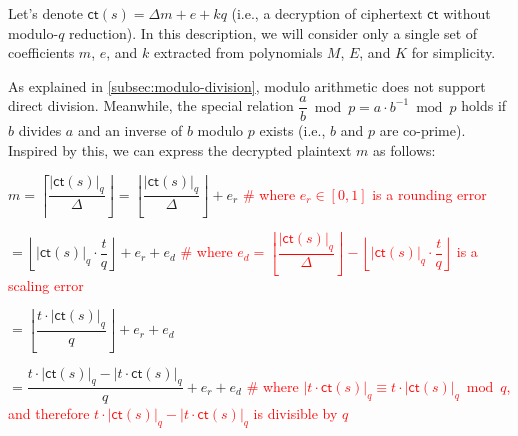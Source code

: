 Let's denote $\textsf{ct}(s) = \Delta m + e + kq$ (i.e., a decryption of ciphertext $\textsf{ct}$ without modulo-$q$ reduction). In this description, we will consider only a single set of coefficients $m$, $e$, and $k$ extracted from polynomials $M$, $E$, and $K$ for simplicity. 

As explained in \autoref{subsec:modulo-division}, modulo arithmetic does not support direct division. Meanwhile, the special relation $\dfrac{a}{b} \bmod p = a \cdot b^{-1} \bmod p$ holds if $b$ divides $a$ and an inverse of $b$ modulo $p$ exists (i.e., $b$ and $p$ are co-prime). Inspired by this, we can express the decrypted plaintext $m$ as follows: 

$m = \left\lceil\dfrac{|\textsf{ct}(s)|_q}{\Delta}\right\rfloor = \left\lfloor\dfrac{|\textsf{ct}(s)|_q}{\Delta}\right\rfloor + e_r$ \textcolor{red}{ \# where $e_r \in [0, 1]$ is a rounding error}

$ = \left\lfloor |\textsf{ct}(s)|_q\cdot \dfrac{t}{q} \right\rfloor + e_r + e_d$  \textcolor{red}{ \# where $e_d = \left\lfloor\dfrac{|\textsf{ct}(s)|_q}{\Delta}\right\rfloor - \left\lfloor |\textsf{ct}(s)|_q\cdot \dfrac{t}{q} \right\rfloor$ is a scaling error} 

$= \left\lfloor\dfrac{t\cdot |\textsf{ct}(s)|_q}{q}\right\rfloor + e_r + e_d$ 

$= \dfrac{t\cdot |\textsf{ct}(s)|_q - |t\cdot \textsf{ct}(s)|_q}{q} + e_r + e_d$ \textcolor{red}{ \# where $|t\cdot \textsf{ct}(s)|_q \equiv t\cdot |\textsf{ct}(s)|_q \bmod q$, and therefore $t\cdot |\textsf{ct}(s)|_q - |t\cdot \textsf{ct}(s)|_q$ is divisible by $q$}

$ $






